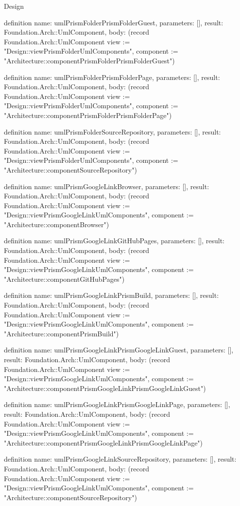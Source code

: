 \begin{lexlean}{Design}
\begin{semanticmodule}
definition{
  name: umlPrismFolderPrismFolderGuest,
  parameters: [],
  result: Foundation.Arch::UmlComponent,
  body: (record Foundation.Arch::UmlComponent {view := "Design::viewPrismFolderUmlComponents", component := "Architecture::componentPrismFolderPrismFolderGuest"})
}

definition{
  name: umlPrismFolderPrismFolderPage,
  parameters: [],
  result: Foundation.Arch::UmlComponent,
  body: (record Foundation.Arch::UmlComponent {view := "Design::viewPrismFolderUmlComponents", component := "Architecture::componentPrismFolderPrismFolderPage"})
}

definition{
  name: umlPrismFolderSourceRepository,
  parameters: [],
  result: Foundation.Arch::UmlComponent,
  body: (record Foundation.Arch::UmlComponent {view := "Design::viewPrismFolderUmlComponents", component := "Architecture::componentSourceRepository"})
}

definition{
  name: umlPrismGoogleLinkBrowser,
  parameters: [],
  result: Foundation.Arch::UmlComponent,
  body: (record Foundation.Arch::UmlComponent {view := "Design::viewPrismGoogleLinkUmlComponents", component := "Architecture::componentBrowser"})
}

definition{
  name: umlPrismGoogleLinkGitHubPages,
  parameters: [],
  result: Foundation.Arch::UmlComponent,
  body: (record Foundation.Arch::UmlComponent {view := "Design::viewPrismGoogleLinkUmlComponents", component := "Architecture::componentGitHubPages"})
}

definition{
  name: umlPrismGoogleLinkPrismBuild,
  parameters: [],
  result: Foundation.Arch::UmlComponent,
  body: (record Foundation.Arch::UmlComponent {view := "Design::viewPrismGoogleLinkUmlComponents", component := "Architecture::componentPrismBuild"})
}

definition{
  name: umlPrismGoogleLinkPrismGoogleLinkGuest,
  parameters: [],
  result: Foundation.Arch::UmlComponent,
  body: (record Foundation.Arch::UmlComponent {view := "Design::viewPrismGoogleLinkUmlComponents", component := "Architecture::componentPrismGoogleLinkPrismGoogleLinkGuest"})
}

definition{
  name: umlPrismGoogleLinkPrismGoogleLinkPage,
  parameters: [],
  result: Foundation.Arch::UmlComponent,
  body: (record Foundation.Arch::UmlComponent {view := "Design::viewPrismGoogleLinkUmlComponents", component := "Architecture::componentPrismGoogleLinkPrismGoogleLinkPage"})
}

definition{
  name: umlPrismGoogleLinkSourceRepository,
  parameters: [],
  result: Foundation.Arch::UmlComponent,
  body: (record Foundation.Arch::UmlComponent {view := "Design::viewPrismGoogleLinkUmlComponents", component := "Architecture::componentSourceRepository"})
}


\end{semanticmodule}
\end{lexlean}
